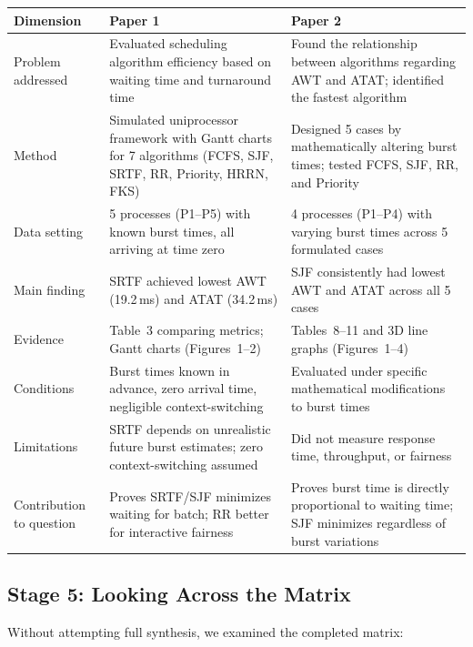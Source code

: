 \documentclass[11pt, a4paper]{article}
\begin{document}
\begin{longtable}{@{}p{3cm} p{5.5cm} p{5.5cm}@{}}
    \toprule
    \textbf{Dimension} & \textbf{Paper 1} & \textbf{Paper 2} \\
    \midrule
    \endhead
    Problem addressed & Evaluated scheduling algorithm efficiency based on waiting time and turnaround time & Found the relationship between algorithms regarding AWT and ATAT; identified the fastest algorithm \\
    \midrule
    Method & Simulated uniprocessor framework with Gantt charts for 7 algorithms (FCFS, SJF, SRTF, RR, Priority, HRRN, FKS) & Designed 5 cases by mathematically altering burst times; tested FCFS, SJF, RR, and Priority \\
    \midrule
    Data setting & 5 processes (P1--P5) with known burst times, all arriving at time zero & 4 processes (P1--P4) with varying burst times across 5 formulated cases \\
    \midrule
    Main finding & SRTF achieved lowest AWT (19.2\,ms) and ATAT (34.2\,ms) & SJF consistently had lowest AWT and ATAT across all 5 cases \\
    \midrule
    Evidence & Table~3 comparing metrics; Gantt charts (Figures~1--2) & Tables~8--11 and 3D line graphs (Figures~1--4) \\
    \midrule
    Conditions & Burst times known in advance, zero arrival time, negligible context-switching & Evaluated under specific mathematical modifications to burst times \\
    \midrule
    Limitations & SRTF depends on unrealistic future burst estimates; zero context-switching assumed & Did not measure response time, throughput, or fairness \\
    \midrule
    Contribution to question & Proves SRTF/SJF minimizes waiting for batch; RR better for interactive fairness & Proves burst time is directly proportional to waiting time; SJF minimizes regardless of burst variations \\
    \bottomrule
\end{longtable}

\subsection{Stage 5: Looking Across the Matrix}
Without attempting full synthesis, we examined the completed matrix:
\end{document}
